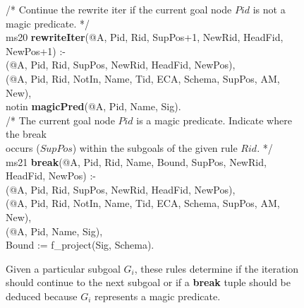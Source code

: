 \begin{figure}[!t]
\ssp
\centering
\begin{boxedminipage}{\linewidth}
/* Continue the rewrite iter if the current goal node $Pid$ is not a magic predicate. */ \\
ms20 {\bf rewriteIter}(@A, Pid, Rid, SupPos+1, NewRid, HeadFid, NewPos+1) :- \\
(@A, Pid, Rid, SupPos, NewRid, HeadFid, NewPos), \\
(@A, Pid, Rid, NotIn, Name, Tid, ECA, Schema, SupPos, AM, New), \\
\datalogspace notin {\bf magicPred}(@A, Pid, Name, Sig). \\

/* The current goal node $Pid$ is a magic predicate. Indicate where the break \\
occurs ($SupPos$) within the subgoals of the given rule $Rid$. */ \\
ms21 {\bf break}(@A, Pid, Rid, Name, Bound, SupPos, NewRid, HeadFid, NewPos) :- \\
(@A, Pid, Rid, SupPos, NewRid, HeadFid, NewPos), \\
(@A, Pid, Rid, NotIn, Name, Tid, ECA, Schema, SupPos, AM, New), \\
(@A, Pid, Name, Sig), \\
\datalogspace Bound := f\_project(Sig, Schema). \\

\end{boxedminipage}
\caption{\label{ch:evita:fig:mpgoal} Given a particular subgoal $G_i$, these rules determine
if the iteration should continue to the next subgoal or if a {\bf break} tuple should be
deduced because $G_i$ represents a magic predicate. }
\end{figure}


